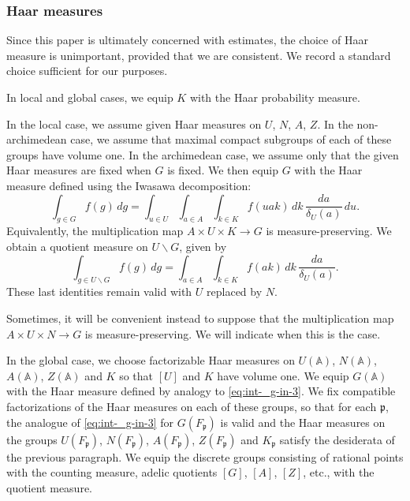 \subsubsection{Haar measures}\label{sec:haar-measures}
Since this paper is ultimately concerned with estimates, the choice of Haar measure is unimportant, provided that we are consistent.  We record a standard choice sufficient for our purposes.

In local and global cases, we equip $K$ with the Haar probability measure.

In the local case, we assume given Haar measures on $U$, $N$, $A$, $Z$.  In the non-archimedean case, we assume that maximal compact subgroups of each of these groups have volume one.  In the archimedean case, we assume only that the given Haar measures are fixed when $G$ is fixed.  We then equip $G$ with the Haar measure defined using the Iwasawa decomposition:
\begin{equation}\label{eq:int-_g-in-3}
  \int_{g \in G} f(g) \, d g
  = \int_{u \in U}
  \int_{a \in A}
  \int_{k \in K}
  f(u a k)
  \, d k
  \, \frac{d a}{\delta_U(a)}
  \, d u.
\end{equation}
Equivalently, the multiplication map $A \times U \times K \rightarrow G$ is measure-preserving.  We obtain a quotient measure on $U \backslash G$, given by
\begin{equation}\label{eq:int-_g-in-U-bakslash-G}
  \int_{g \in U \backslash G} f(g) \, d g
  =
  \int_{a \in A}
  \int_{k \in K}
  f(a k)
  \, d k
  \, \frac{d a}{\delta_U(a)}.
\end{equation}
These last identities remain valid with $U$ replaced by $N$.

Sometimes, it will be convenient instead to suppose that the multiplication map $A \times U \times N \rightarrow G$ is measure-preserving.  We will indicate when this is the case.

In the global case, we choose factorizable Haar measures on $U(\mathbb{A})$, $N(\mathbb{A})$, $A(\mathbb{A})$, $Z(\mathbb{A})$ and $K$ so that $[U]$ and $K$ have volume one.  We equip $G(\mathbb{A})$ with the Haar measure defined by analogy to \eqref{eq:int-_g-in-3}.  We fix compatible factorizations of the Haar measures on each of these groups, so that for each $\mathfrak{p}$, the analogue of \eqref{eq:int-_g-in-3} for $G(F_\mathfrak{p})$ is valid and the Haar measures on the groups $U(F_\mathfrak{p})$, $N(F_\mathfrak{p})$, $A(F_\mathfrak{p})$, $Z(F_\mathfrak{p})$ and $K_\mathfrak{p}$ satisfy the desiderata of the previous paragraph.  We equip the discrete groups consisting of rational points with the counting measure, adelic quotients $[G]$, $[A]$, $[Z]$, etc., with the quotient measure.

